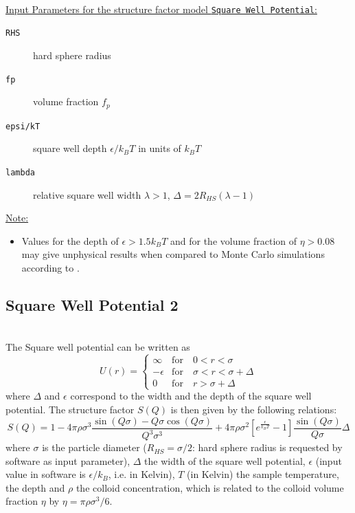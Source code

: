 ~\\
\uline{Input Parameters for the structure factor model \texttt{Square Well Potential}:}
\begin{description}
\item[\texttt{RHS}] hard sphere radius
\item[\texttt{fp}] volume fraction $f_p$
\item[\texttt{epsi/kT}]square well depth $\epsilon/k_BT$ in units of $k_BT$
\item[\texttt{lambda}] relative square well width $\lambda>1$, $\Delta=2R_{HS}(\lambda-1)$
\end{description}

\noindent\uline{Note:}
\begin{itemize}
\item Values for the depth of $\epsilon>1.5k_BT$ and for the volume
fraction of $\eta> 0.08$ may give unphysical results when
compared to Monte Carlo simulations according to \cite{Sharma1977}.
\end{itemize}


\subsection{Square Well Potential 2} ~\\

The Square well potential can be written as
\begin{equation}
U(r) =
 \begin{cases}
      \infty    & \text{for} \quad 0<r<\sigma \\
      -\epsilon & \text{for} \quad \sigma<r<\sigma+\Delta \\
      0         & \text{for} \quad r>\sigma+\Delta
   \end{cases}
\end{equation}
where $\Delta$ and $\epsilon$ correspond to the width and the
depth of the square well potential. The structure factor $S(Q)$ is
then given by the following relations:
\begin{equation}
S(Q)  = 1
-4\pi\rho\sigma^3\frac{\sin(Q\sigma)-Q\sigma\cos(Q\sigma)}{Q^3\sigma^3}
          +4\pi\rho\sigma^2\left[e^{\frac{\epsilon}{k_BT}}-1\right]\frac{\sin(Q\sigma)}{Q\sigma}
          \Delta
\end{equation}
where $\sigma$ is the particle diameter ($R_{HS} = \sigma/2$: hard
sphere radius is requested by software as input parameter),
$\Delta$ the width of the square well potential, $\epsilon$ (input
value in software is $\epsilon/k_B$, i.e. in Kelvin), $T$ (in
Kelvin) the sample temperature, the depth and $\rho$ the colloid
concentration, which is related to the colloid volume fraction
$\eta$ by $\eta=\pi\rho\sigma^3/6$.


